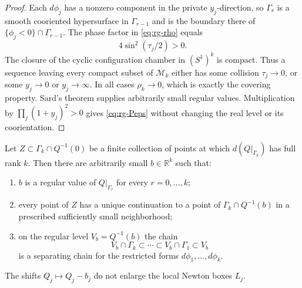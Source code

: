 \begin{proof}
Each \(d\phi_j\) has a nonzero component in the private \(y_j\)-direction,
so \(\Gamma_r\) is a smooth cooriented hypersurface in \(\Gamma_{r-1}\) and
is the boundary there of \(\{\phi_j<0\}\cap\Gamma_{r-1}\).
The phase factor in \eqref{eq:rg-rho} equals
\[
 4\sin^2(\tau_j/2)>0.
\]
The closure of the cyclic configuration chamber in \((S^1)^k\) is compact.
Thus a sequence leaving every compact subset of \(\mathcal M_k\) either has
some collision \(\tau_j\to0\), or some \(y_j\to0\) or \(y_j\to\infty\).
In all cases \(\rho_k\to0\), which is exactly the covering property.  Sard's
theorem supplies arbitrarily small regular values.  Multiplication by
\(\prod_j(1+y_j)^2>0\) gives \eqref{eq:rg-Peps} without changing the real
level or its coorientation.
\end{proof}

\begin{lemma}
\label{lem:rg-regularization}
Let $Z\subset\Gamma_k\cap Q^{-1}(0)$ be a finite collection of points at which
$d(Q|_{\Gamma_k})$ has full rank $k$.  Then there are arbitrarily small
$b\in\mathbb R^k$ such that:
\begin{enumerate}
\item $b$ is a regular value of $Q|_{\Gamma_r}$ for every $r=0,\ldots,k$;
\item every point of $Z$ has a unique continuation to a point of
$\Gamma_k\cap Q^{-1}(b)$ in a prescribed sufficiently small neighborhood;
\item on the regular level $V_b=Q^{-1}(b)$ the chain
\[
 V_b\cap\Gamma_k\subset\cdots\subset V_b\cap\Gamma_1\subset V_b
\]
is a separating chain for the restricted forms $d\phi_1,\ldots,d\phi_k$.
\end{enumerate}
The shifts $Q_j\mapsto Q_j-b_j$ do not enlarge the local Newton boxes $L_j$.
\end{lemma}

